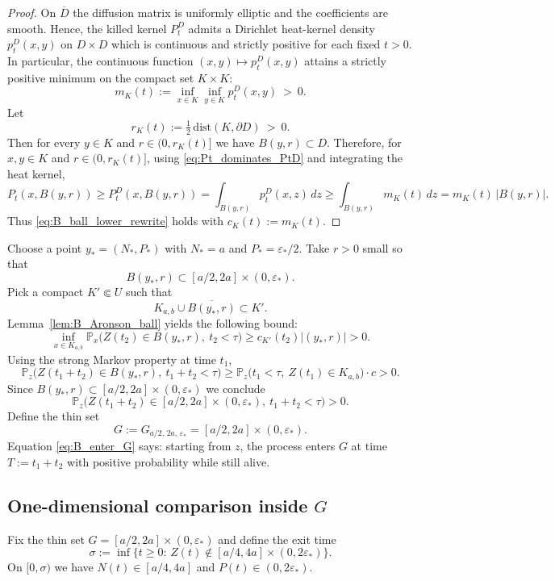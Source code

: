 \documentclass[pdflatex,sn-mathphys-ay]{sn-jnl}
\theoremstyle{thmstyleone}
\theoremstyle{definition}
\theoremstyle{remark}
\begin{document}
\begin{appendices}
\begin{proof}
On $\overline D$ the diffusion matrix is uniformly elliptic and the coefficients are smooth. Hence, the killed kernel
$P_t^D$ admits a Dirichlet heat-kernel density $p_t^D(x,y)$ on $D\times D$ which is continuous and strictly positive
for each fixed $t>0$. In particular, the continuous function $(x,y)\mapsto p_t^D(x,y)$ attains a strictly positive
minimum on the compact set $K\times K$:
\[
m_K(t):=\inf_{x\in K}\inf_{y\in K} p_t^D(x,y)\ >\ 0.
\]
Let
\[
r_K(t):=\tfrac12\,\mathrm{dist}(K,\partial D)\ >\ 0.
\]
Then for every $y\in K$ and $r\in(0,r_K(t)]$ we have $B(y,r)\subset D$.
Therefore, for $x,y\in K$ and $r\in(0,r_K(t)]$, using \eqref{eq:Pt_dominates_PtD} and integrating the heat kernel,
\[
P_t(x,B(y,r))
\ge P_t^D(x,B(y,r))
= \int_{B(y,r)} p_t^D(x,z)\,dz
\ge \int_{B(y,r)} m_K(t)\,dz
= m_K(t)\,|B(y,r)|.
\]
Thus \eqref{eq:B_ball_lower_rewrite} holds with $c_K(t):=m_K(t)$.
\end{proof}
Choose a point $y_*=(N_*,P_*)$ with $N_*=a$ and $P_*=\varepsilon_*/2$. Take $r>0$ small so that
\[
B(y_*,r)\subset [a/2,2a]\times(0,\varepsilon_*).
\]
Pick a compact $K'\Subset U$ such that
\[
K_{a,b} \cup \overline{B(y_*,r)} \subset K'.
\]
Lemma~\ref{lem:B_Aronson_ball} yields the following bound:
\[
\inf_{x\in K_{a,b}}\mathbb P_x\bigl(Z(t_2)\in B(y_*,r),\ t_2<\tau\bigr)\ge c_{K'}(t_2)\lvert (y_*,r)\rvert>0.
\]
Using the strong Markov property at time $t_1$,
\[
\mathbb P_z\bigl(Z(t_1+t_2)\in B(y_*,r),\ t_1+t_2<\tau\bigr)
\ge \mathbb P_z\bigl(t_1<\tau,\ Z(t_1)\in K_{a,b}\bigr)\cdot c>0.
\]
Since $B(y_*,r)\subset [a/2,2a]\times(0,\varepsilon_*)$ we conclude
\begin{equation}\label{eq:B_enter_G}
\mathbb P_z\bigl(Z(t_1+t_2)\in [a/2,2a]\times(0,\varepsilon_*),\ t_1+t_2<\tau\bigr)>0.
\end{equation}
Define the thin set
\[
G:=G_{a/2,\,2a,\,\varepsilon_*}=[a/2,2a]\times(0,\varepsilon_*).
\]
Equation \eqref{eq:B_enter_G} says: starting from $z$, the process enters $G$ at time $T:=t_1+t_2$ with positive
probability while still alive.

\subsection{One-dimensional comparison inside \texorpdfstring{$G$}{G}}

Fix the thin set $G=[a/2,2a]\times(0,\varepsilon_*)$ and define the exit time
\[
\sigma:=\inf\{t\ge 0:\, Z(t)\notin [a/4,4a]\times(0,2\varepsilon_*)\}.
\]
On $[0,\sigma)$ we have $N(t)\in[a/4,4a]$ and $P(t)\in(0,2\varepsilon_*)$.


\end{appendices}
\end{document}
